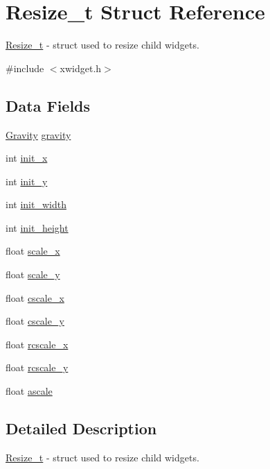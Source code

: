 \hypertarget{structResize__t}{}\section{Resize\+\_\+t Struct Reference}
\label{structResize__t}


\hyperlink{structResize__t}{Resize\+\_\+t} -\/ struct used to resize child widgets.  




{\ttfamily \#include $<$xwidget.\+h$>$}

\subsection*{Data Fields}
\begin{DoxyCompactItemize}
\item 
\hyperlink{xwidget_8h_a5b77df25933eae1169c9efbc78391ade}{Gravity} \hyperlink{structResize__t_a20c3835bb7bf53474f4d54447ffcd191}{gravity}
\item 
int \hyperlink{structResize__t_aff15bb95322452215ca38c4f3c926cd1}{init\+\_\+x}
\item 
int \hyperlink{structResize__t_a2f2c63ce1d407649d6b8daf4d6fbbb98}{init\+\_\+y}
\item 
int \hyperlink{structResize__t_ac2ac6971401bfef5bbfa578068fc65bb}{init\+\_\+width}
\item 
int \hyperlink{structResize__t_ad3562783d29d76a51cb07dbeb7c6042e}{init\+\_\+height}
\item 
float \hyperlink{structResize__t_a66246e7c08afdbe8f576ec4224a4fd3c}{scale\+\_\+x}
\item 
float \hyperlink{structResize__t_ab21caee367ce8e911c1e9b678d3d299e}{scale\+\_\+y}
\item 
float \hyperlink{structResize__t_adde90facb06c76169ff56eeaa39d4c68}{cscale\+\_\+x}
\item 
float \hyperlink{structResize__t_a3a10c30c03b7d10bb546f07f20cafcb1}{cscale\+\_\+y}
\item 
float \hyperlink{structResize__t_a10a63bdd75d925ef236c23baf2480a26}{rcscale\+\_\+x}
\item 
float \hyperlink{structResize__t_af5d4bf846b37172a1f4285f52d03a6d2}{rcscale\+\_\+y}
\item 
float \hyperlink{structResize__t_a9ab8b994c089d137a4c4d6e9dffdb05b}{ascale}
\end{DoxyCompactItemize}


\subsection{Detailed Description}
\hyperlink{structResize__t}{Resize\+\_\+t} -\/ struct used to resize child widgets. 


